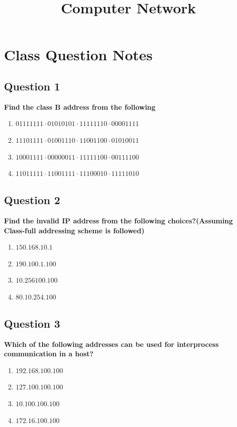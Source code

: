 \documentclass[12pt]{article}
\title{Computer Network}
\author{}
\date{}
\begin{document}
\maketitle

\section*{Class Question Notes}
\subsection*{Question 1}
\textbf{Find the class B address from the following}\\
\begin{enumerate}[label=(\Alph*)]
    \item $01111111\cdot01010101\cdot 11111110 \cdot 00001111$
    \item $11101111\cdot01001110\cdot11001100\cdot01010011$
    \item $10001111\cdot00000011\cdot11111100\cdot00111100$
    \item $11011111\cdot11001111\cdot11100010\cdot11111010$
\end{enumerate}


\subsection*{Question 2}
\textbf{Find the invalid IP address from the following choices?(Assuming Class-full addressing scheme is followed)} \\
\begin{enumerate}[label=(\Alph*)]
    \item $150.168.10.1$
    \item $190.100.1.100$
    \item $10.256100.100$
    \item $80.10.254.100$
\end{enumerate}

\subsection*{Question 3}
\textbf{Which of the following addresses can be used for interprocess
communication in a host?}
\begin{enumerate}[label=(\Alph*)]
    \item $192.168.100.100$
    \item $127.100.100.100$
    \item $10.100.100.100$
    \item $172.16.100.100$
\end{enumerate}
\end{document}
